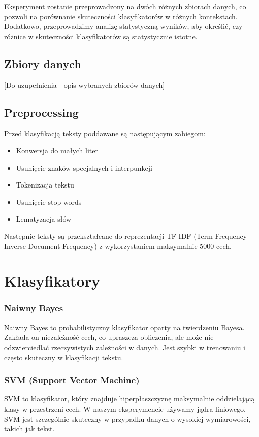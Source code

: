 \documentclass[runningheads]{llncs}
\begin{document}
Eksperyment zostanie przeprowadzony na dwóch różnych zbiorach danych, co pozwoli na porównanie skuteczności klasyfikatorów w różnych kontekstach. Dodatkowo, przeprowadzimy analizę statystyczną wyników, aby określić, czy różnice w skuteczności klasyfikatorów są statystycznie istotne.

\subsection{Zbiory danych}
[Do uzupełnienia - opis wybranych zbiorów danych]

\subsection{Preprocessing}
Przed klasyfikacją teksty poddawane są następującym zabiegom:
\begin{itemize}
    \item Konwersja do małych liter
    \item Usunięcie znaków specjalnych i interpunkcji
    \item Tokenizacja tekstu
    \item Usunięcie stop words
    \item Lematyzacja słów
\end{itemize}

Następnie teksty są przekształcane do reprezentacji TF-IDF (Term Frequency-Inverse Document Frequency) z wykorzystaniem maksymalnie 5000 cech.

\section{Klasyfikatory}

\subsubsection{Naiwny Bayes}
Naiwny Bayes to probabilistyczny klasyfikator oparty na twierdzeniu Bayesa. Zakłada on niezależność cech, co upraszcza obliczenia, ale może nie odzwierciedlać rzeczywistych zależności w danych. Jest szybki w trenowaniu i często skuteczny w klasyfikacji tekstu.

\subsubsection{SVM (Support Vector Machine)}
SVM to klasyfikator, który znajduje hiperpłaszczyznę maksymalnie oddzielającą klasy w przestrzeni cech. W naszym eksperymencie używamy jądra liniowego. SVM jest szczególnie skuteczny w przypadku danych o wysokiej wymiarowości, takich jak tekst.
\end{document}

